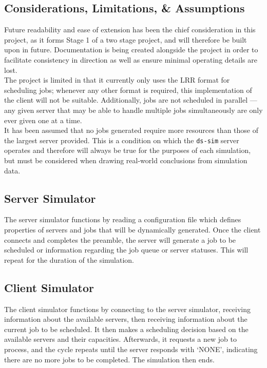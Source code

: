 \documentclass[a4paper]{article} %
\begin{document}
\subsection{Considerations, Limitations, \& Assumptions}
Future readability and ease of extension has been the chief consideration in this project, as it forms Stage 1 of a two stage project, and will therefore be built upon in future. Documentation is being created alongside 
the project in order to facilitate consistency in direction as well as ensure minimal operating details are lost.\\
The project is limited in that it currently only uses the LRR format for scheduling jobs; whenever any other format is required, this implementation of the client will not be suitable. Additionally, jobs are not scheduled 
in parallel --- any given server that may be able to handle multiple jobs simultaneously are only ever given one at a time.\\
It has been assumed that no jobs generated require more resources than those of the largest server provided. This is a condition on which the \texttt{ds-sim} server operates and therefore will always be true for the 
purposes of each simulation, but must be considered when drawing real-world conclusions from simulation data.
\subsection{Server Simulator}
The server simulator functions by reading a configuration file which defines properties of servers and jobs that will be dynamically generated. Once the client connects and completes the preamble, the server will generate 
a job to be scheduled or information regarding the job queue or server statuses. This will repeat for the duration of the simulation.
\subsection{Client Simulator}
The client simulator functions by connecting to the server simulator, receiving information about the available servers, then receiving information about the current job to be scheduled. It then makes a scheduling decision 
based on the available servers and their capacities. Afterwards, it requests a new job to process, and the cycle repeats until the server responds with `NONE', indicating there are no more jobs to be completed. The simulation 
then ends.

\pagebreak
\end{document}
